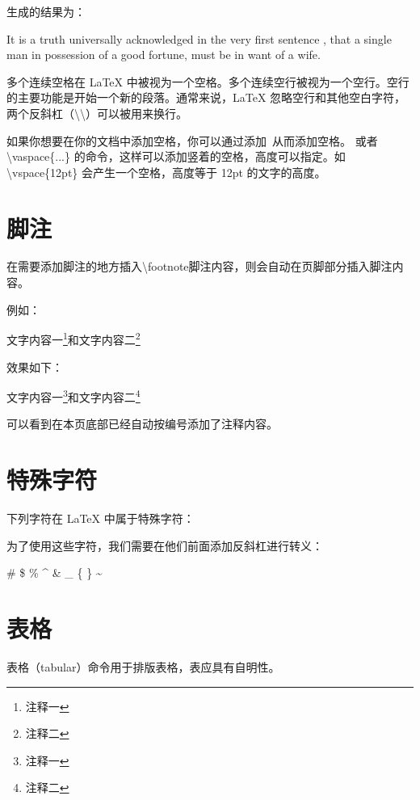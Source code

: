 生成的结果为：

It is a truth universally acknowledged %
in the very first sentence , that a single man in possession of a good fortune,
must be in want of a wife.

多个连续空格在 LaTeX 中被视为一个空格。多个连续空行被视为一个空行。空行的主要功能是开始一个新的段落。通常来说，LaTeX 忽略空行和其他空白字符，两个反斜杠（\textbackslash\textbackslash）可以被用来换行。

如果你想要在你的文档中添加空格，你可以通过添加~从而添加空格。
或者 \textbackslash vaspace\{...\} 的命令，这样可以添加竖着的空格，高度可以指定。如 \textbackslash vspace\{12pt\} 会产生一个空格，高度等于 12pt 的文字的高度。

\section{脚注}

在需要添加脚注的地方插入\textbackslash footnote{脚注内容}，则会自动在页脚部分插入脚注内容。

例如：

\begin{python}
文字内容一\footnote{注释一}和文字内容二\footnote{注释二}
\end{python}

效果如下：

文字内容一\footnote{注释一}和文字内容二\footnote{注释二}

可以看到在本页底部已经自动按编号添加了注释内容。

\section{特殊字符}

下列字符在 LaTeX 中属于特殊字符：

\begin{python}
#
$
%
^
&
_
{
}
~
\
\end{python}

为了使用这些字符，我们需要在他们前面添加反斜杠进行转义：

\begin{python}
\#
\$
\%
\^{}
\&
\_
\{
\}
\~{}
\end{python}

\section{表格}

表格（tabular）命令用于排版表格，表应具有自明性。

